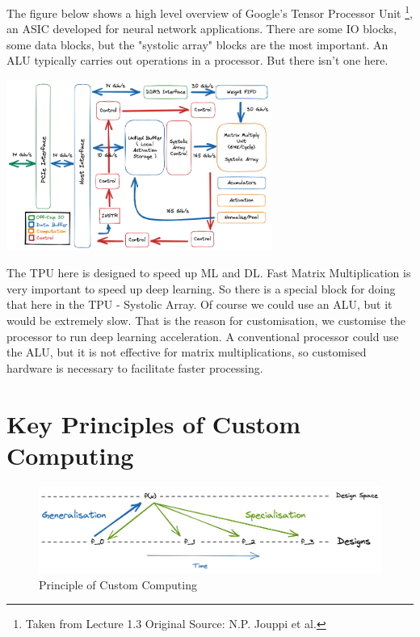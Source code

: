 \documentclass[a4paper]{scrartcl}
\begin{document}
\begin{example}
    The figure below shows a high level overview of Google's Tensor Processor Unit
    \footnote{Taken from Lecture 1.3 Original Source: N.P. Jouppi et al.}, an ASIC
    developed for neural network applications. 
    There are some IO blocks, some data blocks, but the "systolic array" blocks
    are the most important. An ALU typically carries out operations in a processor. But there
    isn't one here. 
    \begin{center}
        \includegraphics[width=0.65\textwidth]{figures/L1-TPU.png}
    \end{center}
    

    The TPU here is designed to speed up ML and DL. Fast Matrix Multiplication is very
    important to speed up deep learning. So there is a special block for doing that here 
    in the TPU - Systolic Array. Of course we could use an ALU, but it would be extremely slow.
    That is the reason for customisation, we customise the processor to run deep learning
    acceleration. A conventional processor could use the ALU, but it is not effective for 
    matrix multiplications, so customised hardware is necessary to facilitate faster
    processing. 
\end{example}




\section{Key Principles of Custom Computing}
\begin{figure}[H]
    \includegraphics[width=\textwidth]{figures/L1-Generalise+Specialise.png}
    \caption{Principle of Custom Computing}
    \label{fig:generalise-specialise}
\end{figure}
\end{document}
